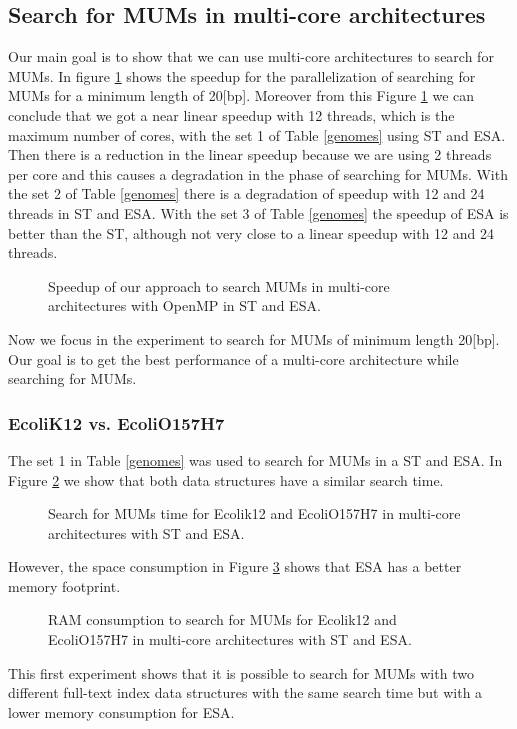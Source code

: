 \documentclass{acm_proc_article-sp}
\begin{document}
 \subsection{Search for MUMs in multi-core architectures}
Our main goal is to show that we can use multi-core architectures to search for MUMs. In figure \ref{fig:speedup} shows the speedup for the parallelization of searching for MUMs for a minimum length of 20[bp]. Moreover from this Figure \ref{fig:speedup} we can conclude that we got a near linear speedup with 12 threads, which is the maximum number of cores, with the set 1 of Table \ref{genomes} using ST and ESA. Then there is a reduction in the linear speedup because we are using 2 threads per core and this causes a degradation in the phase of searching for MUMs. With the set 2 of Table \ref{genomes} there is a degradation of speedup with 12 and 24 threads in ST and ESA. With the set 3 of Table \ref{genomes} the speedup of ESA is better than the ST, although not very close to a linear speedup with 12 and 24 threads.
\begin{figure}[h]
  \centering
  \caption{Speedup of our approach to search MUMs in multi-core architectures with OpenMP in ST and ESA.}
  \label{fig:speedup}
\end{figure}  
Now we focus in the experiment to search for MUMs of minimum length 20[bp]. Our goal is to get the best performance of a multi-core architecture while searching for MUMs.
\subsubsection{EcoliK12 vs. EcoliO157H7}
The set 1 in Table \ref{genomes} was used to search for MUMs in a ST and ESA. In Figure \ref{fig:ecoli-mum} we show that both data structures have a similar search time.
\begin{figure}[h]
  \centering
  \caption{Search for MUMs time for Ecolik12 and EcoliO157H7 in multi-core architectures with ST and ESA.}
  \label{fig:ecoli-mum}
\end{figure}  
However, the space consumption in Figure \ref{fig:ecoli-ram} shows that ESA has a better memory footprint.
\begin{figure}[h]
  \centering
  \caption{RAM consumption to search for MUMs for Ecolik12 and EcoliO157H7 in multi-core architectures with ST and ESA.}
  \label{fig:ecoli-ram}
\end{figure}  
This first experiment shows that it is possible to search for MUMs with two different full-text index data structures with the same search time but with a lower memory consumption for ESA.
\end{document}
